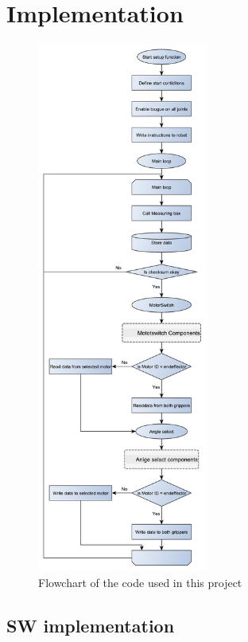 \chapter{Implementation}\label{Implementation}
\begin{figure}
    \centering
    \includegraphics[width=0.5\textwidth]{Figures/Technical_figures/Smallerflowchart.pdf}
    \caption{Flowchart of the code used in this project}
    \label{fig:my_label}
\end{figure}

\section{SW implementation}
